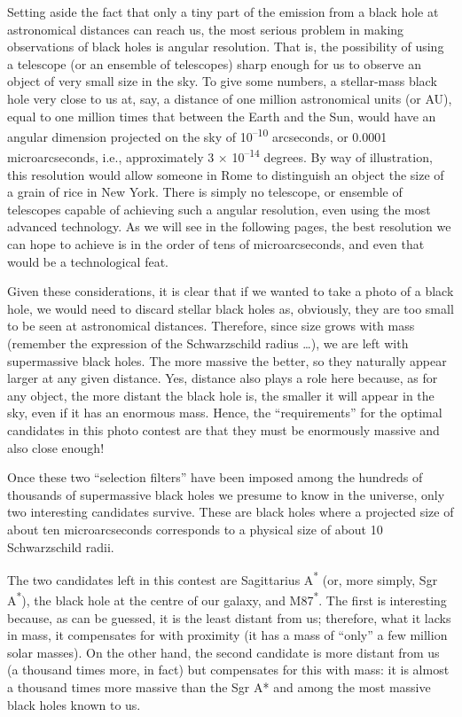 Setting aside the fact that only a tiny part of the emission from a black hole at
astronomical distances can reach us, the most serious problem in making observations of
black holes is angular resolution. That is, the possibility of using
a telescope (or an ensemble of telescopes) sharp enough for us to observe an object of
very small size in the sky. To give some numbers, a stellar-mass black hole very close
to us at, say, a distance of one million astronomical units (or AU),
equal to one million times that between the Earth and the Sun, would have an angular
dimension projected on the sky of 10\textsuperscript{--10} arcseconds, or 0.0001
microarcseconds, i.e., approximately 3 × 10\textsuperscript{--14} degrees. By way of
illustration, this resolution would allow someone in Rome to
distinguish an object the size of a grain of rice in New York. There is simply no
telescope, or ensemble of telescopes capable of achieving such a angular resolution,
even using the most advanced technology. As we will see in the following pages, the best
resolution we can hope to achieve is in the order of tens of microarcseconds, and even
that would be a technological feat.

Given these considerations, it is clear that if we wanted to take a photo of a black
hole, we would need to discard stellar black holes as, obviously, they are too small to
be seen at astronomical distances. Therefore, since size grows with mass (remember the
expression of the Schwarzschild radius \ldots), we are left with supermassive black
holes. The more massive the better, so they naturally appear larger at any given
distance. Yes, distance also plays a role here because, as for any object, the more
distant the black hole is, the smaller it will appear in the sky, even if it has an
enormous mass. Hence, the ``requirements'' for the optimal candidates in this photo
contest are that they must be enormously massive and also close enough!

Once these two ``selection filters'' have been imposed among the hundreds of thousands
of supermassive black holes we presume to know in the universe, only two interesting
candidates survive. These are black holes where a projected size of about ten
microarcseconds corresponds to a physical size of about 10 Schwarzschild radii.

The two candidates left in this contest are Sagittarius
A\textsuperscript{*} (or, more simply, Sgr A\textsuperscript{*}), the
black hole at the centre of our galaxy, and M87\textsuperscript{*}.
The first is interesting because, as can be guessed, it is the least distant from us;
therefore, what it lacks in mass, it compensates for with proximity (it has a mass of
``only'' a few million solar masses). On the other hand, the second candidate is more
distant from us (a thousand times more, in fact) but compensates for this with mass: it
is almost a thousand times more massive than the Sgr A* and among the most massive black
holes known to us.

